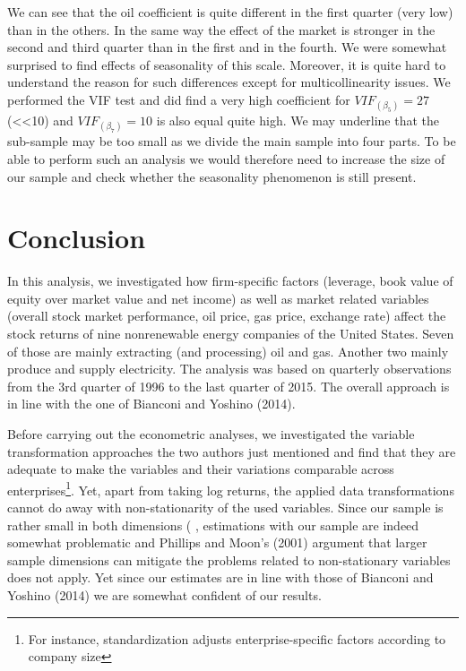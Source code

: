 \documentclass[a4paper]{article}
\begin{document}
We can see that the oil coefficient is quite different in the first quarter (very low) than in the others. In the same way the effect of the market is stronger in the second and third quarter than in the first and in the fourth. 
We were somewhat surprised to find effects of seasonality of this scale. Moreover, it is quite hard to understand the reason for such differences except for multicollinearity issues. 
We performed the VIF test and did find a very high coefficient for $VIF_{(\beta_{5})} = 27$ (<<10) and $VIF_{(\beta_{7})} = 10$ is also equal quite high. We may underline that the sub-sample may be too small as we divide the main sample into four parts. To be able to perform such an analysis we would therefore need to increase the size of our sample and check whether the seasonality phenomenon is still present.

\section{Conclusion}

In this analysis, we investigated how firm-specific factors (leverage, book value of equity over market value and net income) as well as market related variables (overall stock market performance, oil price, gas price, exchange rate) affect the stock returns of nine nonrenewable energy companies of the United States. Seven of those are mainly extracting (and processing) oil and gas. Another two mainly produce and supply electricity. The analysis was based on quarterly observations from the 3rd quarter of 1996 to the last quarter of 2015. The overall approach is in line with the one of Bianconi and Yoshino (2014). 

Before carrying out the econometric analyses, we investigated the variable transformation approaches the two authors just mentioned and find that they are adequate to make the variables and their variations comparable across enterprises\footnote{For instance, standardization adjusts enterprise-specific factors according to company size}. Yet, apart from taking log returns, the applied data transformations cannot do away with non-stationarity of the used variables. Since our sample is rather small in both dimensions ( , estimations with our sample are indeed somewhat problematic and Phillips and Moon's (2001) argument that larger sample dimensions can mitigate the problems related to non-stationary variables does not apply. Yet since our estimates are in line with those of Bianconi and Yoshino (2014) we are somewhat confident of our results. 
\end{document}
